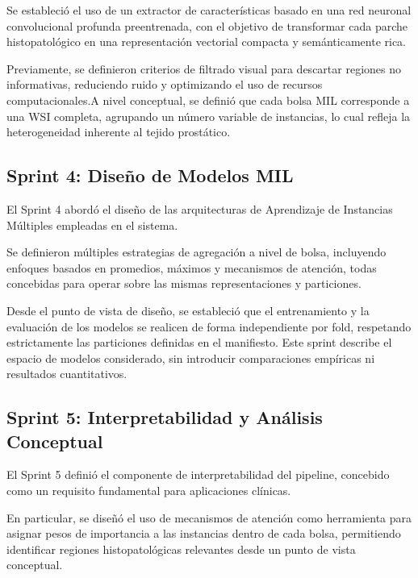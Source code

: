 Se estableció el uso de un extractor de características basado en una red neuronal convolucional profunda preentrenada, con el objetivo de transformar cada parche histopatológico en una representación vectorial compacta y semánticamente rica.\newline

Previamente, se definieron criterios de filtrado visual para descartar regiones no informativas, reduciendo ruido y optimizando el uso de recursos computacionales.A nivel conceptual, se definió que cada bolsa MIL corresponde a una WSI completa, agrupando un número variable de instancias, lo cual refleja la heterogeneidad inherente al tejido prostático.

\subsection{Sprint 4: Diseño de Modelos MIL}
El Sprint 4 abordó el diseño de las arquitecturas de Aprendizaje de Instancias Múltiples empleadas en el sistema.\newline

Se definieron múltiples estrategias de agregación a nivel de bolsa, incluyendo enfoques basados en promedios, máximos y mecanismos de atención, todas concebidas para operar sobre las mismas representaciones y particiones.\newline

Desde el punto de vista de diseño, se estableció que el entrenamiento y la evaluación de los modelos se realicen de forma independiente por fold, respetando estrictamente las particiones definidas en el manifiesto. Este sprint describe el espacio de modelos considerado, sin introducir comparaciones empíricas ni resultados cuantitativos.

\subsection{Sprint 5: Interpretabilidad y Análisis Conceptual}
El Sprint 5 definió el componente de interpretabilidad del pipeline, concebido como un requisito fundamental para aplicaciones clínicas.\newline

En particular, se diseñó el uso de mecanismos de atención como herramienta para asignar pesos de importancia a las instancias dentro de cada bolsa, permitiendo identificar regiones histopatológicas relevantes desde un punto de vista conceptual.\newline

